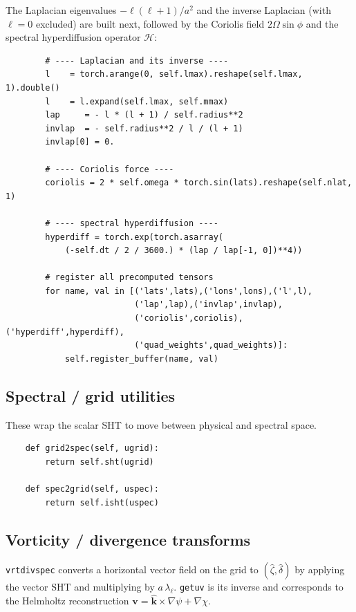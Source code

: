 \documentclass[11pt]{article}
\newcommand{\bvec}[1]{\boldsymbol{#1}}
\begin{document}
\noindent
The Laplacian eigenvalues $-\ell(\ell+1)/a^{2}$ and the inverse
Laplacian (with $\ell=0$ excluded) are built next, followed by the
Coriolis field $2\Omega\sin\phi$ and the spectral hyperdiffusion
operator $\mathcal{H}$:

\begin{lstlisting}
        # ---- Laplacian and its inverse ----
        l    = torch.arange(0, self.lmax).reshape(self.lmax, 1).double()
        l    = l.expand(self.lmax, self.mmax)
        lap     = - l * (l + 1) / self.radius**2
        invlap  = - self.radius**2 / l / (l + 1)
        invlap[0] = 0.

        # ---- Coriolis force ----
        coriolis = 2 * self.omega * torch.sin(lats).reshape(self.nlat, 1)

        # ---- spectral hyperdiffusion ----
        hyperdiff = torch.exp(torch.asarray(
            (-self.dt / 2 / 3600.) * (lap / lap[-1, 0])**4))

        # register all precomputed tensors
        for name, val in [('lats',lats),('lons',lons),('l',l),
                          ('lap',lap),('invlap',invlap),
                          ('coriolis',coriolis),('hyperdiff',hyperdiff),
                          ('quad_weights',quad_weights)]:
            self.register_buffer(name, val)
\end{lstlisting}

\subsection{Spectral / grid utilities}

These wrap the scalar SHT to move between physical and spectral space.

\begin{lstlisting}
    def grid2spec(self, ugrid):
        return self.sht(ugrid)

    def spec2grid(self, uspec):
        return self.isht(uspec)
\end{lstlisting}

\subsection{Vorticity / divergence transforms}

\texttt{vrtdivspec} converts a horizontal vector field on the grid to
$(\hat\zeta,\hat\delta)$ by applying the vector SHT and multiplying by
$a\,\lambda_{\ell}$. \texttt{getuv} is its inverse and corresponds to
the Helmholtz reconstruction $\bvec{v} =
\hat{\bvec{k}}\times\nabla\psi + \nabla\chi$.
\end{document}
